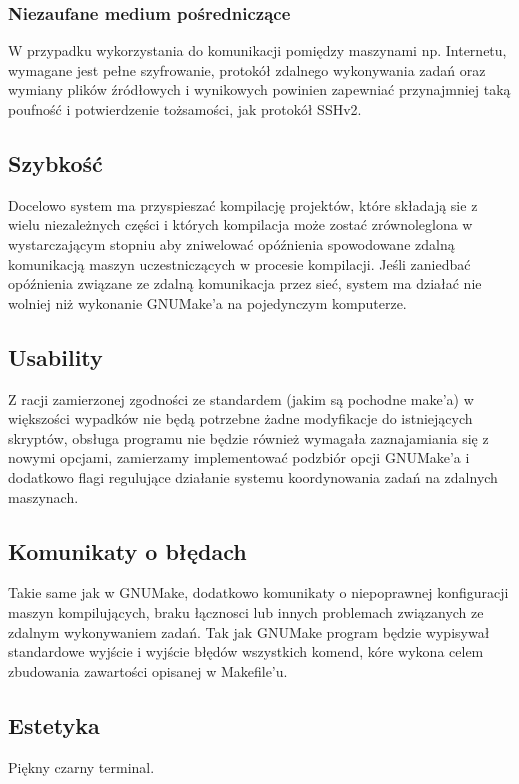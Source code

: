 \documentclass[a4paper]{article}
\begin{document}
\subsubsection{Niezaufane medium pośredniczące}

W przypadku wykorzystania do komunikacji pomiędzy maszynami np. Internetu, wymagane jest pełne szyfrowanie, protokół zdalnego wykonywania zadań oraz wymiany plików źródłowych i wynikowych powinien zapewniać przynajmniej taką poufność i potwierdzenie tożsamości, jak protokół SSHv2.


\subsection{Szybkość}

Docelowo system ma przyspieszać kompilację projektów, które składają sie z wielu niezależnych części i których kompilacja może zostać zrównoleglona w wystarczającym stopniu aby zniwelować opóźnienia spowodowane zdalną komunikacją maszyn uczestniczących w procesie kompilacji.
Jeśli zaniedbać opóźnienia związane ze zdalną komunikacja przez sieć, system ma działać nie wolniej niż wykonanie GNUMake’a na pojedynczym komputerze.


\subsection{Usability}

Z racji zamierzonej zgodności ze standardem (jakim są pochodne make’a) w większości wypadków nie będą potrzebne żadne modyfikacje do istniejących skryptów, obsługa programu nie będzie również wymagała zaznajamiania się z nowymi opcjami, zamierzamy implementować podzbiór opcji GNUMake’a i dodatkowo flagi regulujące działanie systemu koordynowania zadań na zdalnych maszynach.


\subsection{Komunikaty o błędach}

Takie same jak w GNUMake, dodatkowo komunikaty o niepoprawnej konfiguracji maszyn kompilujących, braku łącznosci lub innych problemach związanych ze zdalnym wykonywaniem zadań.
Tak jak GNUMake program będzie wypisywał standardowe wyjście i wyjście błędów wszystkich komend, kóre wykona celem zbudowania zawartości opisanej w Makefile’u.


\subsection{Estetyka}

Piękny czarny terminal.
\end{document}
